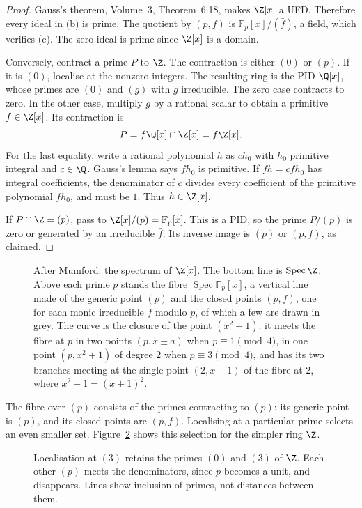 \begin{proof}
Gauss's theorem, Volume~3, Theorem~6.18, makes $\Z[x]$ a UFD. Therefore every ideal in (b) is prime. The quotient by $(p,f)$ is $\mathbb F_p[x]/(\bar f)$, a field, which verifies (c). The zero ideal is prime since $\Z[x]$ is a domain.

Conversely, contract a prime $P$ to $\Z$. The contraction is either $(0)$ or $(p)$. If it is $(0)$, localise at the nonzero integers. The resulting ring is the PID $\Q[x]$, whose primes are $(0)$ and $(g)$ with $g$ irreducible. The zero case contracts to zero. In the other case, multiply $g$ by a rational scalar to obtain a primitive $f\in\Z[x]$. Its contraction is
\[
 P=f\Q[x]\cap\Z[x]=f\Z[x].
\]
For the last equality, write a rational polynomial $h$ as $ch_0$ with $h_0$ primitive integral and $c\in\Q$. Gauss's lemma says $fh_0$ is primitive. If $fh=cfh_0$ has integral coefficients, the denominator of $c$ divides every coefficient of the primitive polynomial $fh_0$, and must be $1$. Thus $h\in\Z[x]$.

If $P\cap\Z=(p)$, pass to $\Z[x]/(p)=\mathbb F_p[x]$. This is a PID, so the prime $P/(p)$ is zero or generated by an irreducible $\bar f$. Its inverse image is $(p)$ or $(p,f)$, as claimed.
\end{proof}

\begin{figure}[ht]
\centering
{}
\caption{After Mumford: the spectrum of $\Z[x]$. The bottom line is $\operatorname{Spec}\Z$. Above each prime $p$ stands the fibre $\operatorname{Spec}\mathbb F_p[x]$, a vertical line made of the generic point $(p)$ and the
closed points $(p,f)$, one for each monic irreducible $\bar f$ modulo $p$, of which a few are drawn in grey. The curve is the closure of the point $(x^2+1)$: it meets the fibre at $p$ in two points
$(p,x\pm a)$ when $p\equiv1\pmod4$, in one point $(p,x^2+1)$ of degree $2$ when $p\equiv3\pmod4$, and has its two branches meeting at the single point $(2,x+1)$ of the fibre at $2$, where $x^2+1=(x+1)^2$.}
\label{fig:specz}
\end{figure}

The fibre over $(p)$ consists of the primes contracting to $(p)$: its generic point is $(p)$, and its closed points are $(p,f)$. Localising at a particular prime selects an even smaller set. Figure~\ref{fig:v10new-ch05-local} shows this selection for the simpler ring $\Z$.

\begin{figure}[ht]
\centering
{}
\caption{Localisation at $(3)$ retains the primes $(0)$ and $(3)$ of $\Z$. Each other $(p)$ meets the denominators, since $p$ becomes a unit, and disappears. Lines show inclusion of primes, not distances between them.}
\label{fig:v10new-ch05-local}
\end{figure}

